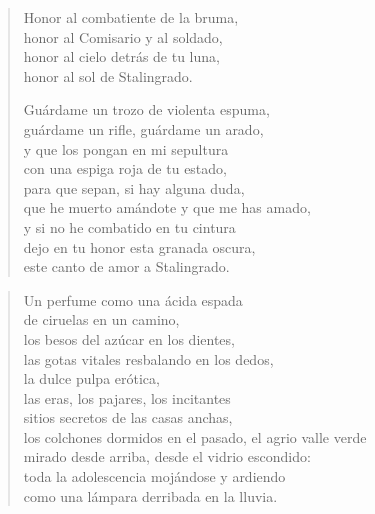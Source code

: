 \documentclass[12pt]{article}
\begin{document}
\begin{verse}
Honor al combatiente de la bruma,\\
honor al Comisario y al soldado,\\
honor al cielo detrás de tu luna,\\
honor al sol de Stalingrado.  

Guárdame un trozo de violenta espuma,\\
guárdame un rifle, guárdame un arado,\\
y que los pongan en mi sepultura\\
con una espiga roja de tu estado,\\
para que sepan, si hay alguna duda,\\
que he muerto amándote y que me has amado,\\
y si no he combatido en tu cintura\\
dejo en tu honor esta granada oscura,\\
este canto de amor a Stalingrado.  

\end{verse}

\clearpage
{}
\begin{verse}

Un perfume como una ácida espada\\
de ciruelas en un camino,\\
los besos del azúcar en los dientes,\\
las gotas vitales resbalando en los dedos,\\
la dulce pulpa erótica,\\
las eras, los pajares, los incitantes\\
sitios secretos de las casas anchas,\\
los colchones dormidos en el pasado, el agrio valle verde\\
mirado desde arriba, desde el vidrio escondido:\\
toda la adolescencia mojándose y ardiendo\\
como una lámpara derribada en la lluvia.  

\end{verse}
\end{document}
